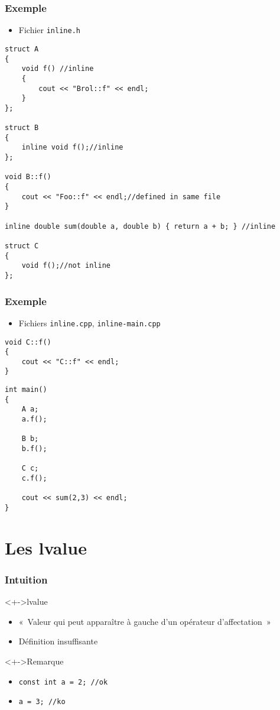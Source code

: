 \begin{frame}[containsverbatim]
\frametitle{Exemple}
\begin{itemize}
\item Fichier \texttt{inline.h}
\end{itemize}
\begin{lstlisting}
struct A
{
	void f() //inline
	{
		cout << "Brol::f" << endl;
	}
};

struct B
{
	inline void f();//inline
};

void B::f()
{
	cout << "Foo::f" << endl;//defined in same file
}

inline double sum(double a, double b) { return a + b; } //inline

struct C
{
	void f();//not inline
};
\end{lstlisting}
\end{frame}

\begin{frame}[containsverbatim]
\frametitle{Exemple}
\begin{itemize}
\item Fichiers \texttt{inline.cpp}, \texttt{inline-main.cpp}
\end{itemize}
\begin{lstlisting}
void C::f()
{
	cout << "C::f" << endl;
}
\end{lstlisting}
\begin{lstlisting}
int main()
{
	A a;
	a.f();

	B b;
	b.f();

	C c;
	c.f();
	
	cout << sum(2,3) << endl;
}
\end{lstlisting}
\end{frame}

\section{Les lvalue}

\begin{frame}
\frametitle{Intuition}
\begin{exampleblock}<+->{lvalue}
	\begin{itemize}[<+->]
	\item «~Valeur qui peut apparaître à gauche d'un opérateur d'affectation~»
	\end{itemize}
\end{exampleblock}
\begin{itemize}[<+->]
\item Définition insuffisante
\end{itemize}
\begin{alertblock}<+->{Remarque}
	\begin{itemize}[<+->]
	\item \lstinline|const int a = 2; //ok|
	\item \lstinline|a = 3; //ko|
	\end{itemize}
\end{alertblock}
\end{frame}

